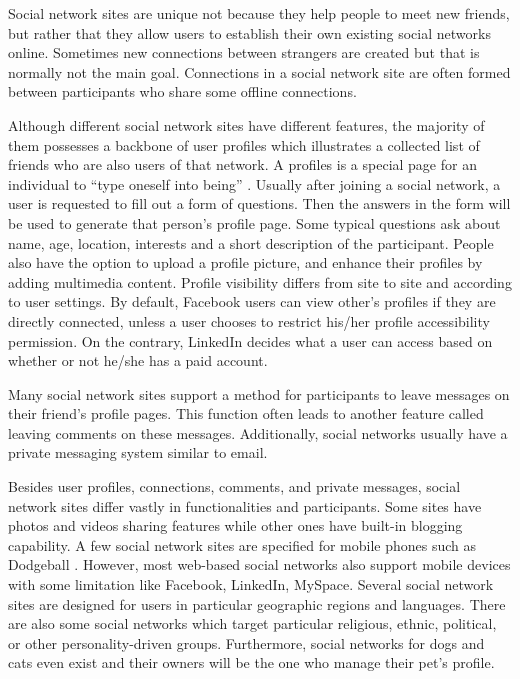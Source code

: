 Social network sites are unique not because they help people to meet new friends, but rather that they allow users to establish their own existing social networks online. Sometimes new connections between strangers are created but that is normally not the main goal. Connections in a social network site are often formed between participants who share some offline connections.

Although different social network sites have different features, the majority of them possesses a backbone of user profiles which illustrates a collected list of friends who are also users of that network. A profiles is a special page for an individual to ``type oneself into being'' \cite{sunden2003material}. Usually after joining a social network, a user is requested to fill out a form of questions. Then the answers in the form will be used to generate that person's profile page. Some typical questions ask about name, age, location, interests and a short description of the participant. People also have the option to upload a profile picture, and enhance their profiles by adding multimedia content. Profile visibility differs from site to site and according to user settings. By default, Facebook users can view other's profiles if they are directly connected, unless a user chooses to restrict his/her profile accessibility permission. On the contrary, LinkedIn decides what a user can access based on whether or not he/she has a paid account.

Many social network sites support a method for participants to leave messages on their friend's profile pages. This function often leads to another feature called leaving comments on these messages. Additionally, social networks usually have a private messaging system similar to email.

Besides user profiles, connections, comments, and private messages, social network sites differ vastly in functionalities and participants. Some sites have photos and videos sharing features while other ones have built-in blogging capability. A few social network sites are specified for mobile phones such as Dodgeball \cite{humphreys2007mobile}. However, most web-based social networks also support mobile devices with some limitation like Facebook, LinkedIn, MySpace. Several social network sites are designed for users in particular geographic regions and languages. There are also some social networks which target particular religious, ethnic, political, or other personality-driven groups. Furthermore, social networks for dogs and cats even exist and their owners will be the one who manage their pet's profile.

